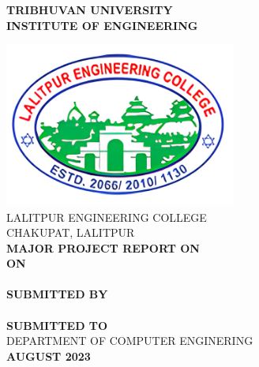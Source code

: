 \begin{center}

    \thispagestyle{empty}
    {\fontsize{16 pt}{12} \selectfont\textbf{TRIBHUVAN UNIVERSITY} \\
        \textbf{INSTITUTE OF ENGINEERING}} \\
    \vspace{0.3 in}

    \includegraphics[width= 3in ]{img/leclogo21.png} \\
    \vspace{0.05 in}
    LALITPUR ENGINEERING COLLEGE \\
    CHAKUPAT, LALITPUR \\

    \vspace{0.5 in}
    \textbf{MAJOR PROJECT REPORT ON}\\
    \textbf{ON}\\
    {\fontsize{16 pt}{12} \selectfont \textbf{\thetitle}}\\
    \vspace{1.1 in}
    \textbf{ SUBMITTED BY}  \\
    {\theauthor} \\
    \vspace{1 in}
    \textbf{ SUBMITTED TO}  \\
    DEPARTMENT OF COMPUTER ENGINERING \\
    \vspace{0.7 in}
    \textbf{AUGUST 2023} \\
\end{center}